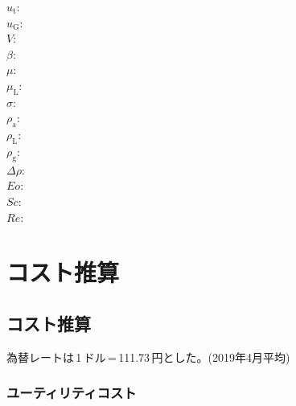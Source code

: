 \documentclass[a4j]{jsreport}
\begin{document}
\begin{multicols}{2}
\begin{flushleft}
    $u_{\mathrm{t}}$:\\
    $u_{\mathrm{G}}$:\\
    $V$:\\
    $\beta$:\\
    $\mu$:\\
    $\mu_{\mathrm{L}}$:\\
    $\sigma$:\\
    $\rho_{\mathrm{a}}$:\\
    $\rho_{\mathrm{L}}$:\\
    $\rho_{\mathrm{g}}$:\\
    $\Delta\rho$:\\
    $Eo$:\\
    $Sc$:\\
    $Re$:
\end{flushleft}
\end{multicols}

\appendix

\chapter{コスト推算}

\section{コスト推算}

為替レートは\,1\,ドル\,=\,111.73\,円とした。(2019年4月平均)
\subsection{ユーティリティコスト}
\end{document}
